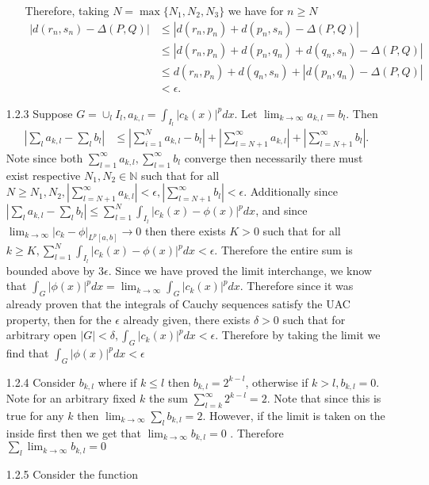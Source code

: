 \documentclass[12pt, letterpaper]{article}
\newcommand{\N}{\mathbb{N}}
\begin{document}
\begin{enumerate}
\begin{enumerate}
		Therefore, taking $N = \max\{N_1,N_2,N_3\}$ we have for $n\geq N$
		\begin{align*}
			|d(r_n,s_n) - \Delta(P,Q)| &\leq |d(r_n,p_n) + d(p_n,s_n) - \Delta(P,Q)|\\
			&\leq |d(r_n,p_n) + d(p_n,q_n) + d(q_n,s_n) - \Delta(P,Q)|\\
			&\leq d(r_n,p_n) + d(q_n,s_n) + |d(p_n,q_n) - \Delta(P,Q)|\\
			&< \epsilon.
		\end{align*}
	\end{enumerate} \fi
	\item[1.2.3] Suppose $G = \cup_l I_l, a_{k,l} = \int_{I_l} |c_k(x)|^p dx$.
	Let $\lim_{k \to \infty} a_{k,l} = b_l$.  Then 
	\begin{align*}
		|\sum_l a_{k,l} - \sum_l b_l| &\leq |\sum_{i=1}^N a_{k,l} - b_l| + 
		|\sum_{l = N+1}^\infty a_{k,l}| + |\sum_{l = N+1}^\infty b_l|. 
	\end{align*}
	Note since both $\sum_{l = 1}^\infty a_{k,l},\sum_{l = 1}^\infty b_l$ converge
	then necessarily there must exist respective $N_1,N_2 \in \N$ such that for 
	all $N \geq N_1, N_2,|\sum_{l = N+1}^\infty a_{k,l}| < \epsilon,
	|\sum_{l = N+1}^\infty b_l|< \epsilon$.  Additionally since $|\sum_l a_{k,l} - \sum_l b_l| \leq \sum_{l=1}^N \int_{I_l} |c_k(x) - \phi(x)|^p dx$, and since 
	$\lim_{k \to \infty} |c_k - \phi|_{L^p[a,b]} \to 0$ then there exists $K > 0$
	such that for all $k \geq K, \sum_{l=1}^N \int_{I_l} |c_k(x) - \phi(x)|^p dx < \epsilon$.  
	Therefore the entire sum is bounded above by $3\epsilon$.  
	Since we have proved the limit interchange, we know that 
	$\int_G |\phi(x)|^p dx = \lim_{k \to \infty}\int_G |c_k(x)|^pdx$.  
	Therefore since it was already proven that the integrals of Cauchy sequences 
	satisfy the UAC property, then for the $\epsilon$ already given, there exists 
	$\delta > 0$ such that for arbitrary open $|G| < \delta, 
	\int_G |c_k(x)|^pdx < \epsilon$.  Therefore by taking the limit we find that
	 $\int_G |\phi(x)|^p dx < \epsilon$
	\item[1.2.4]
	Consider ${b_{k,l}}$ where if $k \leq l $ then $b_{k,l} = 2^{k-l}$, otherwise
	if $k > l, b_{k,l} = 0$.  Note for an arbitrary fixed $k$ the sum 
	$\sum_{l=k}^\infty 2^{k-l} = 2$.  Note that since this is true for any $k$
	then $\lim_{k \to \infty} \sum_{l} b_{k,l} = 2$.  However, if the limit
	is taken on the inside first then we get that $\lim_{k \to \infty} b_{k,l} = 0$
	.  Therefore $\sum_{l} \lim_{k \to \infty} b_{k,l} = 0$
	\item[1.2.5] Consider the function 

\end{enumerate}
\end{document}
